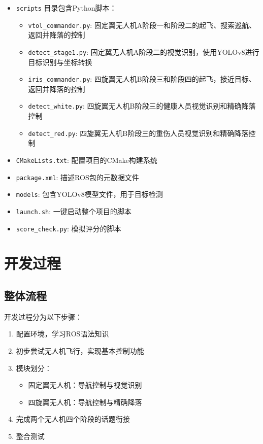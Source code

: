 \documentclass[12pt]{article}
\begin{document}
\begin{itemize}
    \item \texttt{scripts} 目录包含Python脚本：
    \begin{itemize}
        \item \texttt{vtol\_commander.py}: 固定翼无人机A阶段一和阶段二的起飞、搜索巡航、返回并降落的控制
        \item \texttt{detect\_stage1.py}: 固定翼无人机A阶段二的视觉识别，使用YOLOv8进行目标识别与坐标转换
        \item \texttt{iris\_commander.py}: 四旋翼无人机B阶段三和阶段四的起飞，接近目标、返回并降落的控制
        \item \texttt{detect\_white.py}: 四旋翼无人机B阶段三的健康人员视觉识别和精确降落控制
        \item \texttt{detect\_red.py}: 四旋翼无人机B阶段三的重伤人员视觉识别和精确降落控制
    \end{itemize}
    \item \texttt{CMakeLists.txt}: 配置项目的CMake构建系统
    \item \texttt{package.xml}: 描述ROS包的元数据文件
    \item \texttt{models}: 包含YOLOv8模型文件，用于目标检测
    \item \texttt{launch.sh}: 一键启动整个项目的脚本
    \item \texttt{score\_check.py}: 模拟评分的脚本
\end{itemize}

\section{开发过程}
\subsection{整体流程}
开发过程分为以下步骤：
\begin{enumerate}
    \item 配置环境，学习ROS语法知识
    \item 初步尝试无人机飞行，实现基本控制功能
    \item 模块划分：
    \begin{itemize}
        \item 固定翼无人机：导航控制与视觉识别
        \item 四旋翼无人机：导航控制与精确降落
    \end{itemize}
    \item 完成两个无人机四个阶段的话题衔接
    \item 整合测试
\end{enumerate}
\end{document}
